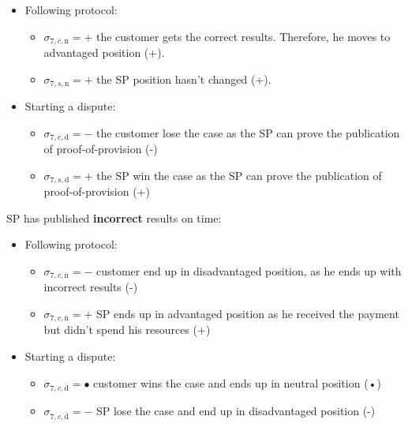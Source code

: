 \documentclass{ieeeaccess}
\begin{document}
\begin{itemize}
\item
  Following protocol:

  \begin{itemize}
  
  \item
    \(\sigma_{7, c, \mathrm{n}} = +\) the customer gets the correct
    results. Therefore, he moves to advantaged position (+).
  \item
    \(\sigma_{7, s, \mathrm{n}} = +\) the SP position hasn't changed
    (+).
  \end{itemize}
\item
  Starting a dispute:

  \begin{itemize}
  
  \item
    \(\sigma_{7, c, \mathrm{d}} = -\) the customer lose the case as the
    SP can prove the publication of proof-of-provision (-)
  \item
    \(\sigma_{7, s, \mathrm{d}} = +\) the SP win the case as the SP can
    prove the publication of proof-of-provision (+)
  \end{itemize}
\end{itemize}

SP has published \textbf{incorrect} results on time:

\begin{itemize}
\item
  Following protocol:

  \begin{itemize}
  
  \item
    \(\sigma_{7, c, \overline{\mathrm{n}}} = -\) customer end up in
    disadvantaged position, as he ends up with incorrect results (-)
  \item
    \(\sigma_{7, c, \overline{\mathrm{n}}} = +\) SP ends up in advantaged
    position as he received the payment but didn't spend his resources
    (+)
  \end{itemize}
\item
  Starting a dispute:

  \begin{itemize}
  
  \item
    \(\sigma_{7, c, \overline{\mathrm{d}}} = •\) customer wins the case and ends up in neutral position (•)
  \item
    \(\sigma_{7, c, \overline{\mathrm{d}}} = -\) SP lose the case and end up in disadvantaged position (-)
  \end{itemize}
\end{itemize}
\end{document}
